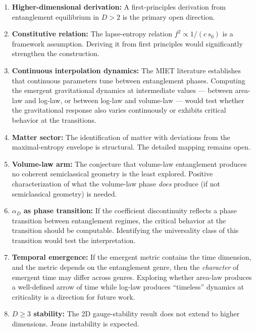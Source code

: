 \documentclass[aps,prd,twocolumn,superscriptaddress,nofootinbib,floatfix]{revtex4-2}
\newcommand{\sn}{s_0}
\begin{document}
\begin{enumerate}
\item \textbf{Higher-dimensional derivation:} A first-principles derivation from entanglement equilibrium in $D > 2$ is the primary open direction.

\item \textbf{Constitutive relation:} The lapse-entropy relation $f^2 \propto 1/(c\,\sn)$ is a framework assumption. Deriving it from first principles would significantly strengthen the construction.

\item \textbf{Continuous interpolation dynamics:} The MIET literature establishes that continuous parameters tune between entanglement phases. Computing the emergent gravitational dynamics at intermediate values --- between area-law and log-law, or between log-law and volume-law --- would test whether the gravitational response also varies continuously or exhibits critical behavior at the transitions.

\item \textbf{Matter sector:} The identification of matter with deviations from the maximal-entropy envelope is structural. The detailed mapping remains open.

\item \textbf{Volume-law arm:} The conjecture that volume-law entanglement produces no coherent semiclassical geometry is the least explored. Positive characterization of what the volume-law phase \emph{does} produce (if not semiclassical geometry) is needed.

\item \textbf{$\alpha_D$ as phase transition:} If the coefficient discontinuity reflects a phase transition between entanglement regimes, the critical behavior at the transition should be computable. Identifying the universality class of this transition would test the interpretation.

\item \textbf{Temporal emergence:} If the emergent metric contains the time dimension, and the metric depends on the entanglement genre, then the \emph{character} of emergent time may differ across genres. Exploring whether area-law produces a well-defined arrow of time while log-law produces ``timeless'' dynamics at criticality is a direction for future work.

\item \textbf{$D \geq 3$ stability:} The 2D gauge-stability result does not extend to higher dimensions. Jeans instability is expected.
\end{enumerate}
\end{document}
